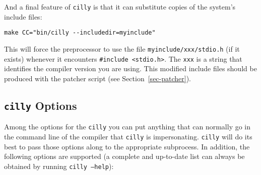 \documentclass{article}
\def\secref#1{Section~\ref{sec-#1}}
\def\t#1{{\tt #1}}
\begin{document}
 And a final feature of \t{cilly} is that it can substitute copies of the
system's include files:

\begin{verbatim}
make CC="bin/cilly --includedir=myinclude"
\end{verbatim}

 This will force the preprocessor to use the file \t{myinclude/xxx/stdio.h}
(if it exists) whenever it encounters \t{\#include <stdio.h>}. The \t{xxx} is
a string that identifies the compiler version you are using. This modified
include files should be produced with the patcher script (see
\secref{patcher}).

  \subsection{\t{cilly} Options}

 Among the options for the \t{cilly} you can put anything that can normally
go in the command line of the compiler that \t{cilly} is impersonating.
\t{cilly} will do its best to pass those options along to the appropriate
subprocess. In addition, the following options are supported (a complete and
up-to-date list can always be obtained by running \t{cilly --help}):
\end{document}
